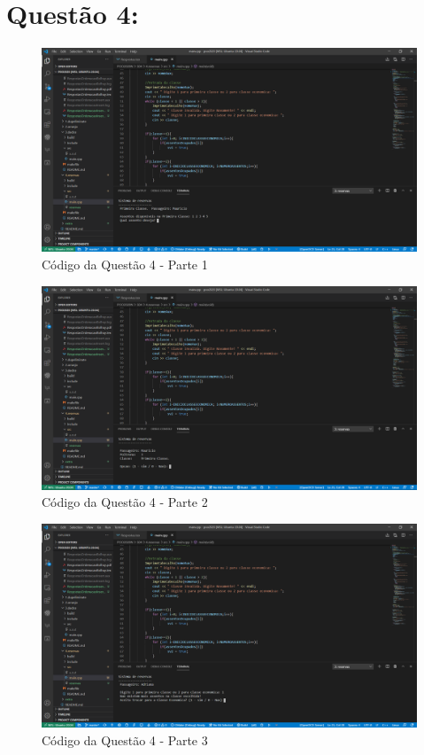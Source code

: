 \documentclass{article}
\begin{document}
\section*{Questão 4:}

\begin{figure}[h!]
  \includegraphics[scale=0.42]{reserva01.png}
  \caption{Código da Questão 4 - Parte 1}
\end{figure}
\begin{figure}[h!]
  \includegraphics[scale=0.42]{reserva02.png}
  \caption{Código da Questão 4 - Parte 2}
\end{figure}
\begin{figure}[h!]
  \includegraphics[scale=0.42]{reserva03.png}
  \caption{Código da Questão 4 - Parte 3}
\end{figure}
\end{document}
